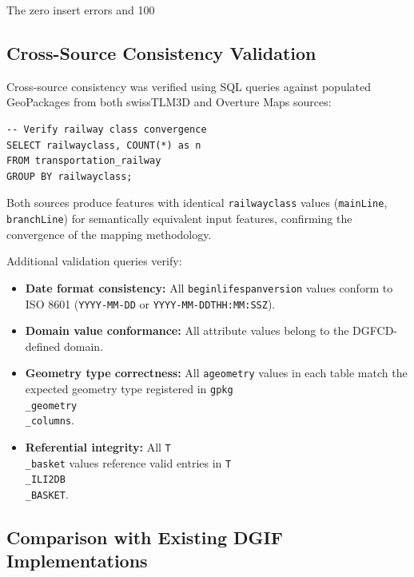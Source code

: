 \documentclass[conference]{IEEEtran}
\begin{document}
The zero insert errors and 100\\%

\subsection{Cross-Source Consistency Validation}

Cross-source consistency was verified using SQL queries against populated GeoPackages from both swissTLM3D and Overture Maps sources:

\begin{lstlisting}
-- Verify railway class convergence
SELECT railwayclass, COUNT(*) as n
FROM transportation_railway
GROUP BY railwayclass;
\end{lstlisting}


Both sources produce features with identical \texttt{railwayclass} values (\texttt{mainLine}, \texttt{branchLine}) for semantically equivalent input features, confirming the convergence of the mapping methodology.

Additional validation queries verify:

\begin{itemize}[leftmargin=*]
\item \textbf{Date format consistency:} All \texttt{beginlifespanversion} values conform to ISO 8601 (\texttt{YYYY-MM-DD} or \texttt{YYYY-MM-DDTHH:MM:SSZ}).
\item \textbf{Domain value conformance:} All attribute values belong to the DGFCD-defined domain.
\item \textbf{Geometry type correctness:} All \texttt{ageometry} values in each table match the expected geometry type registered in \texttt{gpkg\\_geometry\\_columns}.
\item \textbf{Referential integrity:} All \texttt{T\\_basket} values reference valid entries in \texttt{T\\_ILI2DB\\_BASKET}.
\end{itemize}

\subsection{Comparison with Existing DGIF Implementations}
\end{document}
